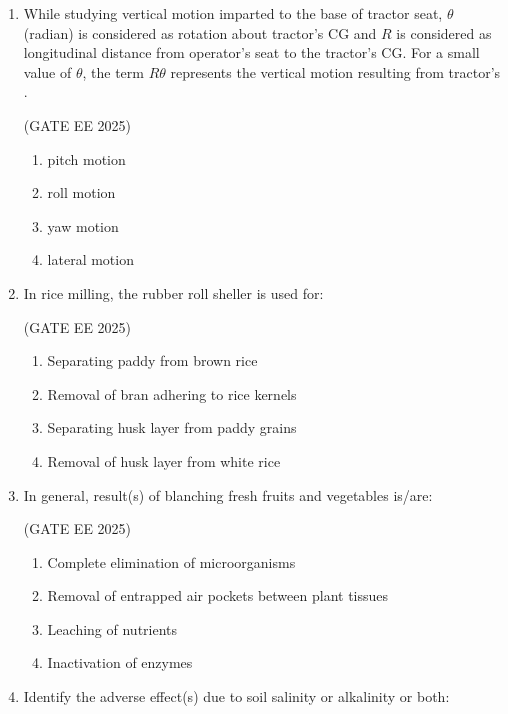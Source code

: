 \documentclass[journal,12pt,onecolumn]{IEEEtran}
\theoremstyle{remark}
\begin{document}
\begin{enumerate}
\item While studying vertical motion imparted to the base of tractor seat, $\theta$ (radian) is considered as rotation about tractor's CG and $R$ is considered as longitudinal distance from operator's seat to the tractor's CG. For a small value of $\theta$, the term $R\theta$ represents the vertical motion resulting from tractor's \underline{\hspace{2cm}}.

\hfill(GATE EE 2025)

\begin{multicols}{4}
\begin{enumerate}
\item pitch motion
\item roll motion
\item yaw motion
\item lateral motion
\end{enumerate}
\end{multicols}

\item In rice milling, the rubber roll sheller is used for:

\hfill(GATE EE 2025)

\begin{multicols}{2}
\begin{enumerate}
\item Separating paddy from brown rice
\item Removal of bran adhering to rice kernels
\item Separating husk layer from paddy grains
\item Removal of husk layer from white rice
\end{enumerate}
\end{multicols}

\item In general, result(s) of blanching fresh fruits and vegetables is/are:

\hfill(GATE EE 2025)

\begin{enumerate}
\item Complete elimination of microorganisms
\item Removal of entrapped air pockets between plant tissues
\item Leaching of nutrients
\item Inactivation of enzymes
\end{enumerate}


\item Identify the adverse effect(s) due to soil salinity or alkalinity or both:


\end{enumerate}
\end{document}
